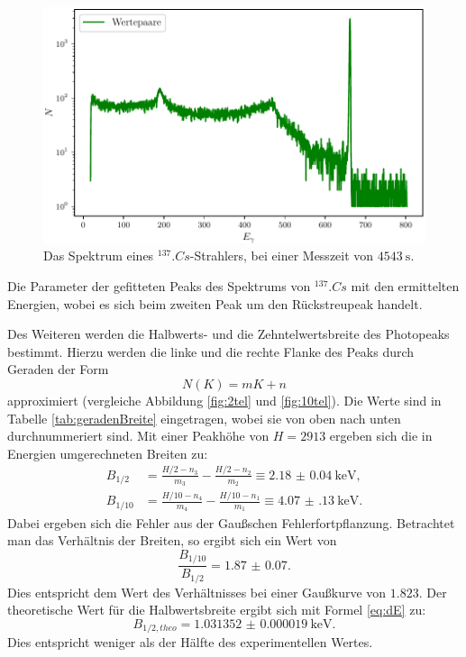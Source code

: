 \begin{figure}
	\centering
	\includegraphics[width=\linewidth-70pt,height=\textheight-70pt,keepaspectratio]{content/images/Cs137.pdf}
	\caption{Das Spektrum eines $^{137}.{Cs}$-Strahlers, bei einer Messzeit von $\SI{4543}{\second}$.}
	\label{fig:SpektrumCs}
\end{figure}

\begin{table}
	\centering
	\caption{Die Parameter der gefitteten Peaks des Spektrums von $^{137}.{Cs}$ mit den ermittelten Energien, wobei es sich beim zweiten Peak um den Rückstreupeak handelt.}
	
	\label{tab:parameterCs}
\end{table}

\noindent Des Weiteren werden die Halbwerts- und die Zehntelwertsbreite des Photopeaks bestimmt. Hierzu werden die linke und die rechte Flanke des Peaks durch Geraden der Form 
\begin{equation}
N(K) = mK+n	\label{eq:Gerade}
\end{equation}
approximiert (vergleiche Abbildung \ref{fig:2tel} und \ref{fig:10tel}). Die Werte sind in Tabelle \ref{tab:geradenBreite} eingetragen, wobei sie von oben nach unten durchnummeriert sind. Mit einer Peakhöhe von $H=2913$ ergeben sich die in Energien umgerechneten Breiten zu:
\begin{align*}
B_{1/2} &= \frac{H/2-n_3}{m_3}-\frac{H/2-n_2}{m_2} \equiv \SI{2.18(4)}{\kilo\electronvolt}\text{,}\\
B_{1/10} &= \frac{H/10-n_4}{m_4}-\frac{H/10-n_1}{m_1} \equiv \SI{4.07(13)}{\kilo\electronvolt}\text{.}
\end{align*}
Dabei ergeben sich die Fehler aus der Gaußschen Fehlerfortpflanzung.
Betrachtet man das Verhältnis der Breiten, so ergibt sich ein Wert von 
\[
\frac{B_{1/10}}{B_{1/2}} = \num{1.87(7)}\text{.}
\]
Dies entspricht dem Wert des Verhältnisses bei einer Gaußkurve von $\num{1.823}$.
Der theoretische Wert für die Halbwertsbreite ergibt sich mit Formel \eqref{eq:dE} zu:
\[
B_{1/2,theo} = \SI{1.031352(19)}{\kilo\electronvolt}\text{.}
\]
Dies entspricht weniger als der Hälfte des experimentellen Wertes.

